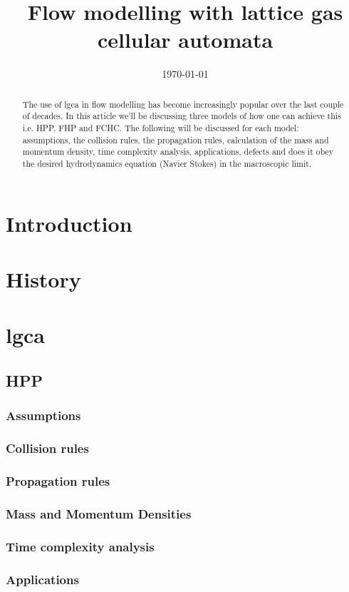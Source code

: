 \documentclass[twocolumn,a4paper,10pt]{article}
\date{\today}
\title{Flow modelling with lattice gas cellular automata}
\begin{document}
\maketitle
\begin{abstract}
The use of \acrshort{lgca} in flow modelling has become increasingly popular over the last couple of decades. In this article we'll be discussing three models of how one can achieve this i.e. HPP, FHP and FCHC. The following will be discussed for each model: assumptions, the collision rules, the propagation rules, calculation of the mass and momentum density, time complexity analysis, applications, defects and does it obey the desired hydrodynamics equation (Navier Stokes) in the macroscopic limit. 
\end{abstract}
\section{Introduction}

\section{History}
\section{\acrfull{lgca}}
\subsection{HPP}
\subsubsection{Assumptions}
\subsubsection{Collision rules}
\subsubsection{Propagation rules}
\subsubsection{Mass and Momentum Densities}
\subsubsection{Time complexity analysis}
\subsubsection{Applications}
\end{document}
